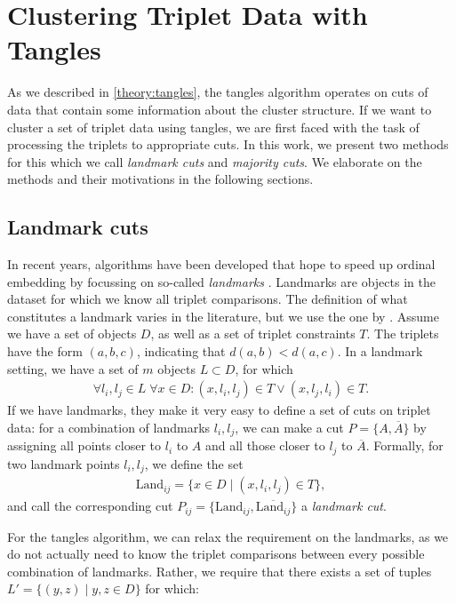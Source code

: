 \chapter{Clustering Triplet Data with Tangles}\label{methods}
As we described in \autoref{theory:tangles}, the tangles algorithm operates on cuts of data that contain some information about the cluster structure.
If we want to cluster a set of triplet data using tangles, we are first faced with the task of processing the triplets to appropriate cuts. In this work, we present two 
methods for this which we call \textit{landmark cuts} and \textit{majority cuts}. We elaborate on the methods and their motivations in the following sections.

\section{Landmark cuts}\label{theory:landmark_cuts}
In recent years, algorithms have been developed that hope to speed up ordinal embedding by focussing on so-called \textit{landmarks} 
\citep{ghoshLandmarkOrdinalEmbedding2019, andertonScalingOrdinalEmbedding2019}. Landmarks are objects in the dataset for which we know all triplet comparisons.  
The definition of what constitutes a landmark varies in the literature, but we use the one by \cite{haghiriComparisonBasedFrameworkPsychophysics2019}.
Assume we have a set of objects $D$, as well as a set of triplet constraints $T$. The triplets 
have the form $(a,b,c)$, indicating that $d(a,b) < d(a,c)$. In a landmark setting, we have a set 
of $m$ objects $L \subset D$, for which 
\begin{align*}
\forall l_i, l_j \in L \; \forall x \in D: (x, l_i, l_j) \in T \vee (x, l_j, l_i) \in T. 
\end{align*}
If we have landmarks, they make it very easy to define a set of cuts on triplet data:
for a combination of landmarks $l_i, l_j$, we can make a cut $P = \{A, \overline{A}\}$ by assigning all points closer to $l_i$ to $A$ and all those closer to $l_j$ to $\overline{A}$. 
Formally, for two landmark points $l_i, l_j$, we define the set
\begin{align*}
    \text{Land} _{ij} = \{ x \in D \mid \left( x, l_i, l_j \right) \in T \}
,\end{align*}
and call the corresponding cut $P_{ij} = \{\text{Land}_{ij}, \overline{\text{Land}_{ij}}\}$ a \textit{landmark cut}.

For the tangles algorithm, we can relax the requirement on the landmarks, as we do not actually
need to know the triplet comparisons between every possible combination of landmarks. Rather, 
we require that there exists a set of tuples $L' = \{ (y, z)  \mid y, z \in D \}$ for which:

